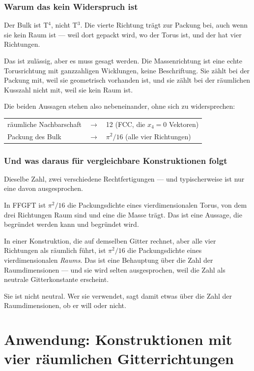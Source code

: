 \subsection*{Warum das kein Widerspruch ist}

Der Bulk ist T$^4$, nicht T$^3$. Die vierte Richtung trägt zur Packung
bei, auch wenn sie kein Raum ist --- weil dort gepackt wird, wo der
Torus ist, und der hat vier Richtungen.

Das ist zulässig, aber es muss gesagt werden. Die Massenrichtung ist
eine echte Torusrichtung mit ganzzahligen Wicklungen, keine
Beschriftung. Sie zählt bei der Packung mit, weil sie geometrisch
vorhanden ist, und sie zählt bei der räumlichen Kusszahl nicht mit,
weil sie kein Raum ist.

Die beiden Aussagen stehen also nebeneinander, ohne sich zu
widersprechen:
\begin{center}
\begin{tabular}{lcl}
räumliche Nachbarschaft & $\longrightarrow$ & 12 (FCC, die $x_4 = 0$ Vektoren) \\
Packung des Bulk & $\longrightarrow$ & $\pi^2/16$ (alle vier Richtungen) \\
\end{tabular}
\end{center}

\subsection*{Und was daraus für vergleichbare Konstruktionen folgt}

Dieselbe Zahl, zwei verschiedene Rechtfertigungen --- und
typischerweise ist nur eine davon ausgesprochen.

In FFGFT ist $\pi^2/16$ die Packungsdichte eines vierdimensionalen
Torus, von dem drei Richtungen Raum sind und eine die Masse trägt. Das
ist eine Aussage, die begründet werden kann und begründet wird.

In einer Konstruktion, die auf demselben Gitter rechnet, aber alle vier
Richtungen als räumlich führt, ist $\pi^2/16$ die Packungsdichte eines
vierdimensionalen \emph{Raums}. Das ist eine Behauptung über die Zahl
der Raumdimensionen --- und sie wird selten ausgesprochen, weil die
Zahl als neutrale Gitterkonstante erscheint.

Sie ist nicht neutral. Wer sie verwendet, sagt damit etwas über die
Zahl der Raumdimensionen, ob er will oder nicht.

\chapter{Anwendung: Konstruktionen mit vier räumlichen
Gitterrichtungen}

